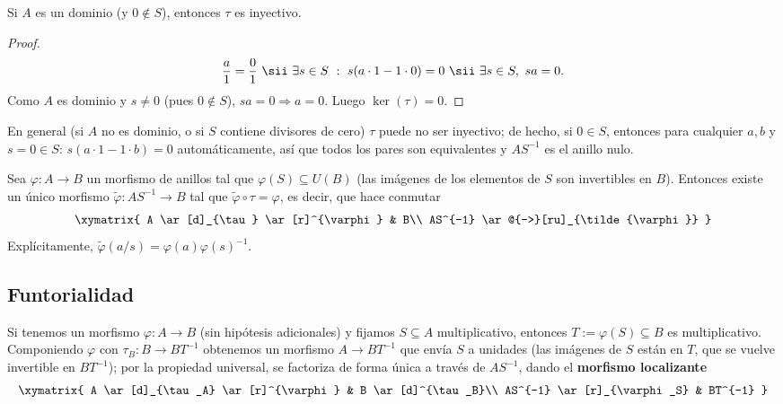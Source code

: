 \begin{prop}
Si $A$ es un dominio (y $0\notin S$), entonces $\tau$ es inyectivo.
\end{prop}
\begin{proof}
\begin{gather*}
    \frac{a}{1} = \frac{0}{1} \ \sii\ \exists s \in S \ : \ s(a\cdot 1 - 1\cdot 0) = 0 \ \sii\ \exists s\in S,\ sa=0.
\end{gather*}
Como $A$ es dominio y $s\neq 0$ (pues $0\notin S$), $sa=0 \Rightarrow a=0$. Luego $\ker(\tau)=0$.
\end{proof}

En general (si $A$ no es dominio, o si $S$ contiene divisores de cero) $\tau$ puede no ser inyectivo; de hecho, si $0\in S$, entonces para cualquier $a,b$ y $s=0\in S$: $s(a\cdot 1-1\cdot b)=0$ automáticamente, así que todos los pares son equivalentes y $AS^{-1}$ es el anillo nulo.

\begin{teo}
Sea $\varphi: A \to B$ un morfismo de anillos tal que $\varphi(S) \subseteq U(B)$ (las imágenes de los elementos de $S$ son invertibles en $B$). Entonces existe un único morfismo $\tilde{\varphi}: AS^{-1}\to B$ tal que $\tilde\varphi\circ \tau = \varphi$, es decir, que hace conmutar
\begin{gather*}
    \xymatrix{
        A \ar[d]_{\tau} \ar[r]^{\varphi} & B\\
        AS^{-1} \ar@{-->}[ru]_{\tilde{\varphi}}
    }
\end{gather*}
Explícitamente, $\tilde\varphi(a/s) = \varphi(a)\varphi(s)^{-1}$.
\end{teo}

\subsection{Funtorialidad}

Si tenemos un morfismo $\varphi:A\to B$ (sin hipótesis adicionales) y fijamos $S\subseteq A$ multiplicativo, entonces $T:=\varphi(S)\subseteq B$ es multiplicativo. Componiendo $\varphi$ con $\tau_B: B\to BT^{-1}$ obtenemos un morfismo $A\to BT^{-1}$ que envía $S$ a unidades (las imágenes de $S$ están en $T$, que se vuelve invertible en $BT^{-1}$); por la propiedad universal, se factoriza de forma única a través de $AS^{-1}$, dando el \textbf{morfismo localizante}
\begin{gather*}
    \xymatrix{
        A \ar[d]_{\tau_A} \ar[r]^{\varphi} & B \ar[d]^{\tau_B}\\
        AS^{-1} \ar[r]_{\varphi_S} & BT^{-1}
    }
\end{gather*}

